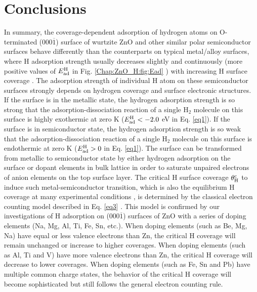 \section{Conclusions}

In summary,  the coverage-dependent adsorption of hydrogen atoms on O-terminated (000$\overline{1}$) surface of wurtzite ZnO and other similar polar semiconductor surfaces behave differently than the counterparts on typical metal/alloy surfaces, where H adsorption strength usually decreases slightly and continuously (more positive values of $E_{\textup{ad}}^{\textup{H}}$ in Fig. \ref{Chap:ZnO_H:fig:Ead} ) with increasing H surface coverage \cite{pallassana1999theoretical,qi2012adsorbate}. The adsorption strength of individual H atom on these semiconductor surfaces strongly depends on hydrogen coverage and surface electronic structures. If the surface is in the metallic state, the hydrogen adsorption strength is so strong that the adsorption-dissociation reaction of a single H$_2$ molecule on this surface is highly exothermic at zero K ($E_{\textup{ad}}^{\textup{H}} < -2.0 $ eV in Eq. \ref{eq1}). If the surface is in semiconductor state, the hydrogen adsorption strength is so weak that the adsorption-dissociation reaction of a single H$_2$ molecule on this surface is endothermic at zero K ($E_{\textup{ad}}^{\textup{H}} > 0 $ in Eq. \ref{eq1}).  The surface can be transformed from metallic to semiconductor state by either hydrogen adsorption on the surface or dopant elements in bulk lattice in order to saturate unpaired electrons of anion elements on the top surface layer. The critical H surface coverage $\theta_{\textup{H}}^{\textup{c}}$ to induce such metal-semiconductor transition, which is also the equilibrium H coverage at many experimental conditions \cite{lin2007density,meyer2004first,lauritsen2011stabilization},  is determined by the classical electron counting model described in Eq. \ref{eq3} \cite{pashley1989electron}. This model is confirmed by our investigations of H adsorption on (000$\overline{1}$) surfaces of ZnO with a series of doping elements (Na, Mg, Al, Ti, Fe, Sn, etc.). When doping elements (such as Be, Mg, Na) have equal or less valence electrons than Zn, the critical H coverage will remain unchanged or increase to higher coverages. When doping elements (such as Al, Ti and V) have more valence electrons than Zn, the critical H coverage will decrease to lower coverages. When doping elements (such as Fe, Sn and Pb) have multiple common charge states, the behavior of the critical H coverage will become sophisticated but still follows the general electron counting rule.

